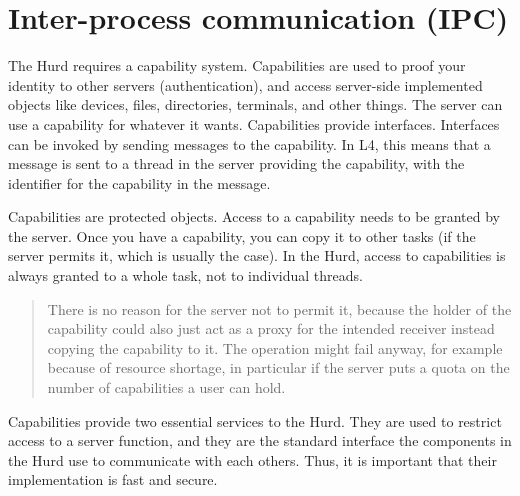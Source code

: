 \documentclass[9pt,a4paper]{extarticle}
\newenvironment{comment}{\footnotesize \begin{quote}}{\end{quote}}
\begin{document}
\section{Inter-process communication (IPC)}
\label{ipc}

The Hurd requires a capability system.  Capabilities are used to proof
your identity to other servers (authentication), and access
server-side implemented objects like devices, files, directories,
terminals, and other things.  The server can use a capability for
whatever it wants.  Capabilities provide interfaces.  Interfaces can
be invoked by sending messages to the capability.  In L4, this means
that a message is sent to a thread in the server providing the
capability, with the identifier for the capability in the message.

Capabilities are protected objects.  Access to a capability needs to
be granted by the server.  Once you have a capability, you can copy it
to other tasks (if the server permits it, which is usually the case).
In the Hurd, access to capabilities is always granted to a whole task,
not to individual threads.

\begin{comment}
  There is no reason for the server not to permit it, because the
  holder of the capability could also just act as a proxy for the
  intended receiver instead copying the capability to it.  The
  operation might fail anyway, for example because of resource
  shortage, in particular if the server puts a quota on the number of
  capabilities a user can hold.
\end{comment}

Capabilities provide two essential services to the Hurd.  They are
used to restrict access to a server function, and they are the
standard interface the components in the Hurd use to communicate with
each others.  Thus, it is important that their implementation is fast
and secure.
\end{document}
